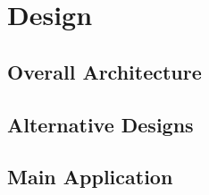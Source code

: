 \chapter{Design}





\section{Overall Architecture}

\section{Alternative Designs}

\section{Main Application}

